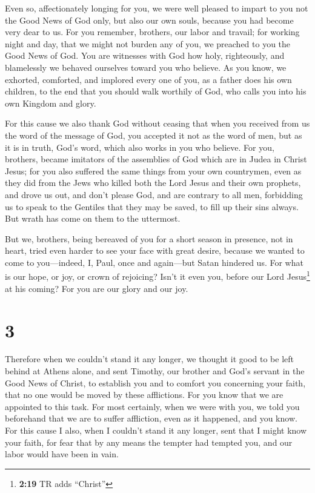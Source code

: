 Even so, affectionately longing for you, we were well
pleased to impart to you not the Good News of God only, but also our own
souls, because you had become very dear to us.  For you
remember, brothers, our labor and travail; for working night and day,
that we might not burden any of you, we preached to you the Good News of
God.  You are witnesses with God how holy, righteously,
and blamelessly we behaved ourselves toward you who believe.
 As you know, we exhorted, comforted, and implored every
one of you, as a father does his own children,  to the
end that you should walk worthily of God, who calls you into his own
Kingdom and glory.

 For this cause we also thank God without ceasing that
when you received from us the word of the message of God, you accepted
it not as the word of men, but as it is in truth, God's word, which also
works in you who believe.  For you, brothers, became
imitators of the assemblies of God which are in Judea in Christ Jesus;
for you also suffered the same things from your own countrymen, even as
they did from the Jews  who killed both the Lord Jesus
and their own prophets, and drove us out, and don't please God, and are
contrary to all men,  forbidding us to speak to the
Gentiles that they may be saved, to fill up their sins always. But wrath
has come on them to the uttermost.

 But we, brothers, being bereaved of you for a short
season in presence, not in heart, tried even harder to see your face
with great desire,  because we wanted to come to
you---indeed, I, Paul, once and again---but Satan hindered us.
 For what is our hope, or joy, or crown of rejoicing?
Isn't it even you, before our Lord Jesus\footnote{\textbf{2:19} TR adds
  ``Christ''} at his coming?  For you are our glory and
our joy.

\hypertarget{section-2}{%
\section{3}\label{section-2}}

 Therefore when we couldn't stand it any longer, we
thought it good to be left behind at Athens alone,  and
sent Timothy, our brother and God's servant in the Good News of Christ,
to establish you and to comfort you concerning your faith,
 that no one would be moved by these afflictions. For you
know that we are appointed to this task.  For most
certainly, when we were with you, we told you beforehand that we are to
suffer affliction, even as it happened, and you know.  For
this cause I also, when I couldn't stand it any longer, sent that I
might know your faith, for fear that by any means the tempter had
tempted you, and our labor would have been in vain.

